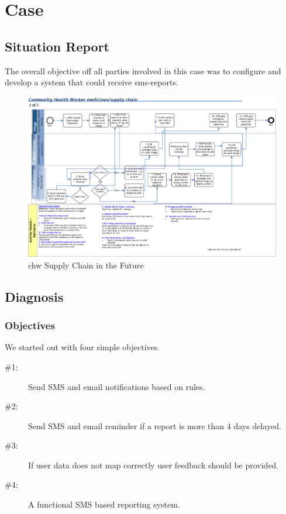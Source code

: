 \chapter{Case}


\section{Situation Report}

The overall objective off all parties involved in this case was to configure and develop a system that could receive \gls{sms}-reports. 

\begin{figure}
\centering
\includegraphics[width=\textwidth]{case/img/chwSupplyChainFuture}
\caption{\gls{chw} Supply Chain in the Future}
\label{chwSupplyChainPresent}
\end{figure}

\section{Diagnosis}

\subsection{Objectives}
We started out with four simple objectives. 

\begin{description}
\item[\#1:] Send SMS and email notifications based on rules.
\item[\#2:] Send SMS and email reminder if a report is more than 4 days delayed.
\item[\#3:] If user data does not map correctly user feedback should be provided.
\item[\#4:] A functional SMS based reporting system.
\end{description}

